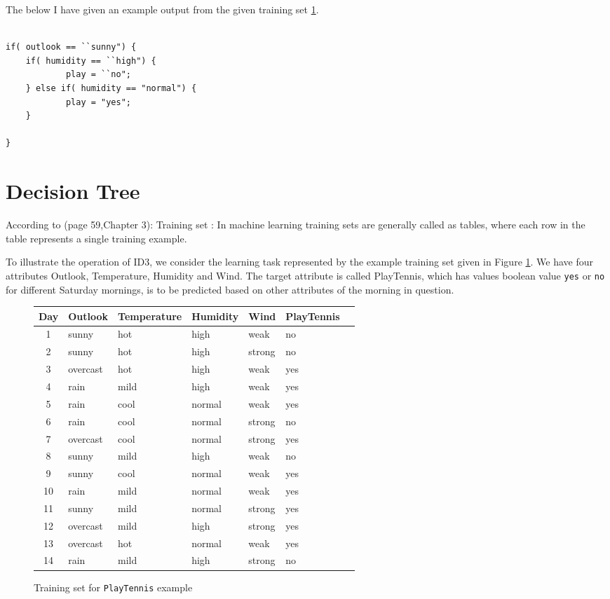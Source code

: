 \documentclass{report}
\begin{document}
The below I have given an example output from the given training set  \ref{fig:trainingplaytennis}.

\begin{lstlisting}

if( outlook == ``sunny") {
	if( humidity == ``high") {
			play = ``no";
	} else if( humidity == "normal") {
			play = "yes";
	}

}
\end{lstlisting}
\pagebreak


\section{Decision Tree}
According to \cite{Mitchell1997MachineLearning}(page 59,Chapter 3): Training set : In machine learning training sets are generally called as tables, where each row in the table represents a single training example. 

To illustrate the operation of ID3, we consider the learning task represented by the example training set given in Figure \ref{fig:trainingplaytennis}. We have four attributes Outlook, Temperature, Humidity and Wind. The target attribute is called PlayTennis, which has values boolean value \texttt{yes} or \texttt{no} for different Saturday mornings, is to be predicted based on other attributes of the morning in question.
\begin{figure}[h]
  \centering
  \begin{tabular}{|c|l|l|l|l|l|l|}
    \hline
    Day & Outlook & Temperature & Humidity & Wind & PlayTennis\\
    \hline
    1 & sunny & hot & high & weak & no
    \\\hline
    2 & sunny & hot & high & strong & no
    \\\hline
    3 & overcast & hot & high & weak & yes
    \\\hline
    4 & rain & mild & high & weak & yes
    \\\hline
    5 & rain & cool & normal & weak & yes
    \\\hline
    6 & rain & cool & normal & strong & no
    \\\hline
    7 & overcast & cool & normal & strong & yes
    \\\hline
    8 & sunny & mild & high & weak & no
    \\\hline
    9 & sunny & cool & normal & weak & yes
    \\\hline
    10 & rain & mild & normal & weak & yes
    \\\hline
    11 & sunny & mild & normal & strong & yes
    \\\hline
    12 & overcast & mild & high & strong & yes
    \\\hline
    13 & overcast & hot & normal & weak & yes
    \\\hline
    14 & rain & mild & high & strong & no
    \\\hline
  \end{tabular}
  \caption{Training set for \texttt{PlayTennis} example}
  \label{fig:trainingplaytennis}
\end{figure}
\end{document}
